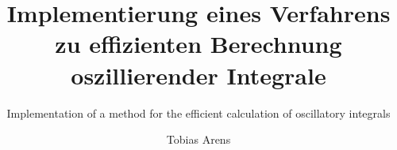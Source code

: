 \documentclass[envcountsame, envcountchap, deutsch]{i-studis}
\begin{document}
\title{Implementierung eines Verfahrens zu effizienten Berechnung oszillierender Integrale}
\subtitle{Implementation of a method for the efficient calculation of oscillatory integrals}

\author{Tobias Arens}


\address{Mehren}


\mytitlepage
\nocite{*}

\frontmatter
\tableofcontents										%
\listoffigures											%
\listoftables											%
\lstlistoflistings										%


\lstset{inputpath=code}
\mainmatter









\backmatter
\printbibliography
\printindex												%


\begin{appendix}
\end{appendix}
\end{document}
